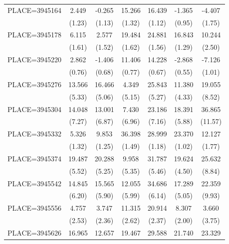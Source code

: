 {\begin{tabular}{l*{6}{c}}
PLACE=3945164       &       2.449&      -0.265&      15.266&      16.439&      -1.365&      -4.407\\
                    &      (1.23)&      (1.13)&      (1.32)&      (1.12)&      (0.95)&      (1.75)\\
PLACE=3945178       &       6.115&       2.577&      19.484&      24.881&      16.843&      10.244\\
                    &      (1.61)&      (1.52)&      (1.62)&      (1.56)&      (1.29)&      (2.50)\\
PLACE=3945220       &       2.862&      -1.406&      11.406&      14.228&      -2.868&      -7.126\\
                    &      (0.76)&      (0.68)&      (0.77)&      (0.67)&      (0.55)&      (1.01)\\
PLACE=3945276       &      13.566&      16.466&       4.349&      25.843&      11.380&      19.055\\
                    &      (5.33)&      (5.06)&      (5.15)&      (5.27)&      (4.33)&      (8.52)\\
PLACE=3945304       &      14.048&      13.001&       7.430&      23.186&      18.391&      36.865\\
                    &      (7.27)&      (6.87)&      (6.96)&      (7.16)&      (5.88)&     (11.57)\\
PLACE=3945332       &       5.326&       9.853&      36.398&      28.999&      23.370&      12.127\\
                    &      (1.32)&      (1.25)&      (1.49)&      (1.18)&      (1.02)&      (1.77)\\
PLACE=3945374       &      19.487&      20.288&       9.958&      31.787&      19.624&      25.632\\
                    &      (5.52)&      (5.25)&      (5.35)&      (5.46)&      (4.50)&      (8.84)\\
PLACE=3945542       &      14.845&      15.565&      12.055&      34.686&      17.289&      22.359\\
                    &      (6.20)&      (5.90)&      (5.99)&      (6.14)&      (5.05)&      (9.93)\\
PLACE=3945556       &       4.757&       3.747&      11.315&      20.914&       8.307&       3.660\\
                    &      (2.53)&      (2.36)&      (2.62)&      (2.37)&      (2.00)&      (3.75)\\
PLACE=3945626       &      16.965&      12.657&      19.467&      29.588&      21.740&      23.329\\

\end{tabular}}
